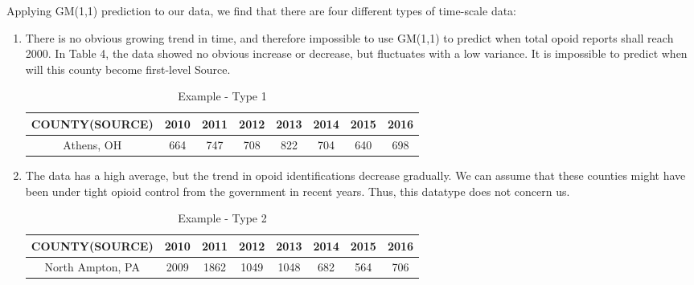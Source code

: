 Applying GM(1,1) prediction to our data, we find that there are four different types of time-scale data:
\begin{enumerate}
	\item There is no obvious growing trend in time, and therefore impossible to use GM(1,1) to predict when total opoid reports shall reach 2000. In Table 4, the data showed no obvious increase or decrease, but fluctuates with a low variance. It is impossible to predict when will this county become first-level Source.
	\begin{table}[H]
		\centering
		\begin{tabular}{|c|c|c|c|c|c|c|c|}
			\hline
			\rowcolor[HTML]{656565} 
			 {\color[HTML]{FFFFFF} \textbf{COUNTY(SOURCE)}} & {\color[HTML]{FFFFFF} \textbf{2010}} & {\color[HTML]{FFFFFF} \textbf{2011}} & {\color[HTML]{FFFFFF} \textbf{2012}} & {\color[HTML]{FFFFFF} \textbf{2013}} & {\color[HTML]{FFFFFF} \textbf{2014}} & {\color[HTML]{FFFFFF} \textbf{2015}} & {\color[HTML]{FFFFFF} \textbf{2016}}\\ \hline
			Athens, OH & 664	& 747 & 708 & 822 & 704	& 640 &	698 \\ \hline
		\end{tabular}
		\centering
		\caption{Example - Type 1 }
	\end{table}

	\item The data has a high average, but the trend in opoid identifications decrease gradually. We can assume that these counties might have been under tight opioid control from the government in recent years. Thus, this datatype does not concern us.
	\begin{table}[H]
		\centering
		\begin{tabular}{|c|c|c|c|c|c|c|c|}
			\hline
			\rowcolor[HTML]{656565} 
			{\color[HTML]{FFFFFF} \textbf{COUNTY(SOURCE)}} & {\color[HTML]{FFFFFF} \textbf{2010}} & {\color[HTML]{FFFFFF} \textbf{2011}} & {\color[HTML]{FFFFFF} \textbf{2012}} & {\color[HTML]{FFFFFF} \textbf{2013}} & {\color[HTML]{FFFFFF} \textbf{2014}} & {\color[HTML]{FFFFFF} \textbf{2015}} & {\color[HTML]{FFFFFF} \textbf{2016}}\\ \hline
			North Ampton, PA & 2009&1862&1049&1048&682&564&706 \\ \hline
		\end{tabular}
		\centering
		\caption{Example - Type 2}
	\end{table}
	

\end{enumerate}
